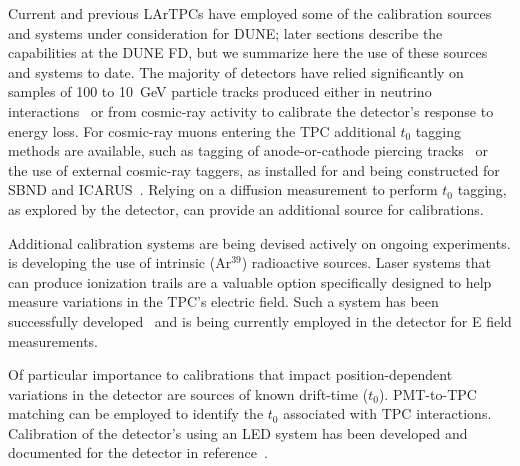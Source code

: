 Current and previous LArTPCs have employed some of the calibration sources and systems under consideration for DUNE; later sections describe the capabilities at the DUNE FD, but we summarize here the use of these sources and systems to date.
The majority of  detectors have relied significantly on samples of \num{100} to \SI{10}{\GeV} particle tracks produced either in neutrino interactions~\cite{Anderson:2012mra} or from cosmic-ray activity to calibrate the detector's response to energy loss. 
For cosmic-ray muons entering the TPC additional $t_0$ tagging methods are available, such as tagging of anode-or-cathode piercing tracks~\cite{MICROBOONE-NOTE-1028-PUB} or the use of external cosmic-ray taggers, as installed for  and being constructed for SBND and ICARUS~\cite{Auger:2016tjc}. Relying on a diffusion measurement to perform $t_0$ tagging, as explored by the  detector, can provide an additional source for calibrations.

Additional calibration systems are being devised actively on ongoing  experiments.  is developing the use of intrinsic (Ar${}^{39}$) radioactive sources. 
Laser systems that can produce ionization trails are a valuable option specifically designed to help measure variations in the TPC's electric field. Such a system has been successfully developed~\cite{Ereditato:2014tya} and is being currently employed in the  detector for E field measurements.


Of particular importance to calibrations that impact position-dependent variations in the detector are sources of known drift-time ($t_0$). PMT-to-TPC matching can be employed to identify the $t_0$ associated with TPC interactions. 
Calibration of the detector's  using an LED system has been developed and documented for the  detector in reference~\cite{Conrad:2015xta}.


